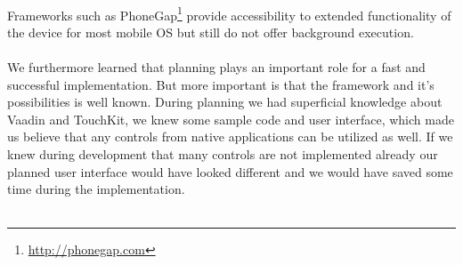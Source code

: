 \\
Frameworks such as PhoneGap\footnote{\url{http://phonegap.com}} provide accessibility to extended functionality of the device for most mobile OS but still do not offer background execution.
\\
\\
We furthermore learned that planning plays an important role for a fast and successful implementation. But more important is that the framework and it's possibilities is well known. During planning we had superficial knowledge about Vaadin and TouchKit, we knew some sample code and user interface, which made us believe that any controls from native applications can be utilized as well. If we knew during development that many controls are not implemented already our planned user interface would have looked different and we would have saved some time during the implementation.
\\
\\

